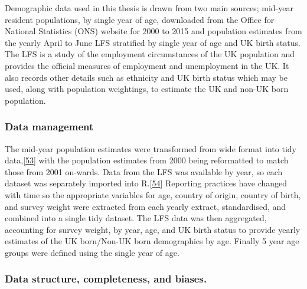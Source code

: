 \documentclass[11pt,twoside]{bristolthesis}
\begin{document}
  Demographic data used in this thesis is drawn from two main sources; mid-year resident populations, by single year of age, downloaded from the Office for National Statistics (ONS) website for 2000 to 2015 and population estimates from the yearly April to June LFS stratified by single year of age and UK birth status. The LFS is a study of the employment circumstances of the UK population and provides the official measures of employment and unemployment in the UK. It also records other details such as ethnicity and UK birth status which may be used, along with population weightings, to estimate the UK and non-UK born population.
  
  \hypertarget{data-management}{%
  \subsubsection{Data management}\label{data-management}}
  
  The mid-year population estimates were transformed from wide format into tidy data,{[}\protect\hyperlink{ref-Wickham2015}{53}{]} with the population estimates from 2000 being reformatted to match those from 2001 on-wards. Data from the LFS was available by year, so each dataset was separately imported into R.{[}\protect\hyperlink{ref-R}{54}{]} Reporting practices have changed with time so the appropriate variables for age, country of origin, country of birth, and survey weight were extracted from each yearly extract, standardised, and combined into a single tidy dataset. The LFS data was then aggregated, accounting for survey weight, by year, age, and UK birth status to provide yearly estimates of the UK born/Non-UK born demographics by age. Finally 5 year age groups were defined using the single year of age.
  
  \hypertarget{data-structure-completeness-and-biases.}{%
  \subsubsection{Data structure, completeness, and biases.}\label{data-structure-completeness-and-biases.}}
  
\end{document}
